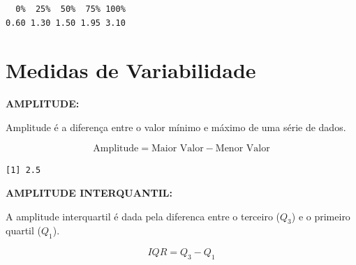 \documentclass[
  letterpaper,
  DIV=11,
  numbers=noendperiod]{scrreprt}
\newenvironment{Shaded}{\begin{snugshade}}{\end{snugshade}}
\newcommand{\AttributeTok}[1]{\textcolor[rgb]{0.40,0.45,0.13}{#1}}
\newcommand{\DecValTok}[1]{\textcolor[rgb]{0.68,0.00,0.00}{#1}}
\newcommand{\FunctionTok}[1]{\textcolor[rgb]{0.28,0.35,0.67}{#1}}
\newcommand{\NormalTok}[1]{\textcolor[rgb]{0.00,0.23,0.31}{#1}}
\newcommand{\OtherTok}[1]{\textcolor[rgb]{0.00,0.23,0.31}{#1}}
\newcommand{\SpecialCharTok}[1]{\textcolor[rgb]{0.37,0.37,0.37}{#1}}
\begin{document}
\begin{Shaded}
\end{Shaded}

\begin{verbatim}
  0%  25%  50%  75% 100% 
0.60 1.30 1.50 1.95 3.10 
\end{verbatim}

\section{Medidas de Variabilidade}\label{medidas-de-variabilidade}

\textbf{AMPLITUDE:}

Amplitude é a diferença entre o valor mínimo e máximo de uma série de
dados.

\[\text{Amplitude} = \text{Maior Valor} - \text{Menor Valor}\]

\begin{Shaded}
\end{Shaded}

\begin{verbatim}
[1] 2.5
\end{verbatim}

\textbf{AMPLITUDE INTERQUANTIL:}

A amplitude interquartil é dada pela diferenca entre o terceiro
(\(Q_3\)) e o primeiro quartil (\(Q_1\)).

\[IQR = Q_3 - Q_1\]

\begin{Shaded}
\end{Shaded}
\end{document}
